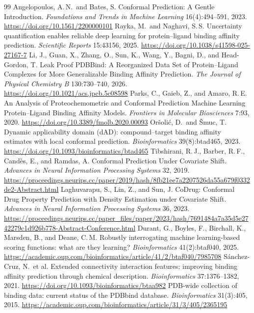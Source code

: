 \documentclass[10pt,twocolumn]{article}
\begin{document}
\begin{thebibliography}{99}
 Angelopoulos, A.\,N.\ and Bates, S. Conformal Prediction: A Gentle Introduction. \emph{Foundations and Trends in Machine Learning} 16(4):494--591, 2023. \url{https://doi.org/10.1561/2200000101}
 Rayka, M.\ and Naghavi, S.\,S. Uncertainty quantification enables reliable deep learning for protein--ligand binding affinity prediction. \emph{Scientific Reports} 15:43156, 2025. \url{https://doi.org/10.1038/s41598-025-27167-7}
 Li, J., Guan, X., Zhang, O., Sun, K., Wang, Y., Bagni, D., and Head-Gordon, T. Leak Proof PDBBind: A Reorganized Data Set of Protein--Ligand Complexes for More Generalizable Binding Affinity Prediction. \emph{The Journal of Physical Chemistry B} 130:730--740, 2026. \url{https://doi.org/10.1021/acs.jpcb.5c08598}
 Parks, C., Gaieb, Z., and Amaro, R.\,E. An Analysis of Proteochemometric and Conformal Prediction Machine Learning Protein--Ligand Binding Affinity Models. \emph{Frontiers in Molecular Biosciences} 7:93, 2020. \url{https://doi.org/10.3389/fmolb.2020.00093}
 Or{\v s}oli{\'c}, D.\ and {\v S}muc, T. Dynamic applicability domain (dAD): compound--target binding affinity estimates with local conformal prediction. \emph{Bioinformatics} 39(8):btad465, 2023. \url{https://doi.org/10.1093/bioinformatics/btad465}
 Tibshirani, R.\,J., Barber, R.\,F., Cand{\`e}s, E., and Ramdas, A. Conformal Prediction Under Covariate Shift. \emph{Advances in Neural Information Processing Systems} 32, 2019. \url{https://proceedings.neurips.cc/paper/2019/hash/8fb21ee7a2207526da55a679f0332de2-Abstract.html}
 Laghuvarapu, S., Lin, Z., and Sun, J. CoDrug: Conformal Drug Property Prediction with Density Estimation under Covariate Shift. \emph{Advances in Neural Information Processing Systems} 36, 2023. \url{https://proceedings.neurips.cc/paper_files/paper/2023/hash/7691484a7a35d5e2742279c1d926b778-Abstract-Conference.html}
 Durant, G., Boyles, F., Birchall, K., Marsden, B., and Deane, C.\,M. Robustly interrogating machine learning-based scoring functions: what are they learning? \emph{Bioinformatics} 41(2):btaf040, 2025. \url{https://academic.oup.com/bioinformatics/article/41/2/btaf040/7985708}
 S{\'a}nchez-Cruz, N.\ et al. Extended connectivity interaction features: improving binding affinity prediction through chemical description. \emph{Bioinformatics} 37:1376--1382, 2021. \url{https://doi.org/10.1093/bioinformatics/btaa982}
 PDB-wide collection of binding data: current status of the PDBbind database. \emph{Bioinformatics} 31(3):405, 2015. \url{https://academic.oup.com/bioinformatics/article/31/3/405/2365195}
\end{thebibliography}
\end{document}
